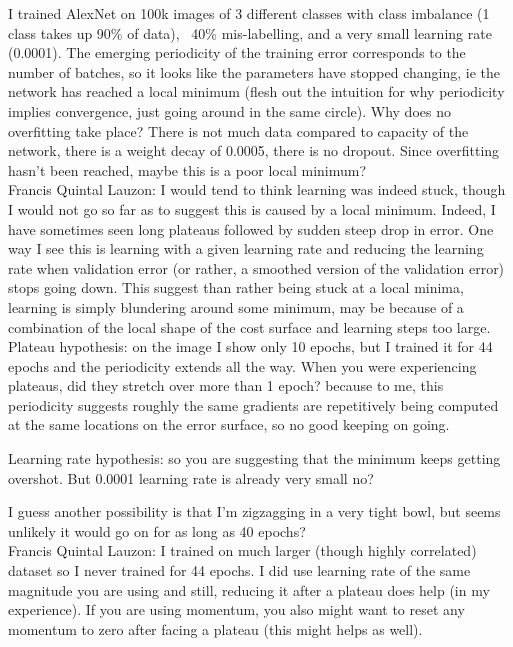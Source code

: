 \documentclass[a4paper,11pt]{article}
\begin{document}
I trained AlexNet on 100k images of 3 different classes with class imbalance (1 class takes up 90\% of data), ~40\% mis-labelling, and a very small learning rate (0.0001). The emerging periodicity of the training error corresponds to the number of batches, so it looks like the parameters have stopped changing, ie the network has reached a local minimum (flesh out the intuition for why periodicity implies convergence, just going around in the same circle). Why does no overfitting take place? There is not much data compared to capacity of the network, there is a weight decay of 0.0005,  there is no dropout. Since overfitting hasn't been reached, maybe this is a poor local minimum?﻿\\

Francis Quintal Lauzon: I would tend to think learning was indeed stuck, though I would not go so far as to suggest this is caused by a local minimum.
Indeed, I have sometimes seen long plateaus followed by sudden steep drop in error.  One way I see this is learning with a given learning rate and reducing the learning rate when validation error (or rather, a smoothed version of the validation error) stops going down.  This suggest than rather being stuck at a local minima, learning is simply blundering around some minimum, may be because of a combination of the local shape of the cost surface and learning steps too large. \\

Plateau hypothesis: on the image I show only 10 epochs, but I trained it for 44 epochs and the periodicity extends all the way. When you were experiencing plateaus, did they stretch over more than 1 epoch? because to me, this periodicity suggests roughly the same gradients are repetitively being computed at the same locations on the error surface, so no good keeping on going. 

Learning rate hypothesis: so you are suggesting that the minimum keeps getting overshot. But 0.0001 learning rate is already very small no?

I guess another possibility is that I'm zigzagging in a very tight bowl, but seems unlikely it would go on for as long as 40 epochs?﻿\\

Francis Quintal Lauzon: I trained on much larger (though highly correlated) dataset so I never trained for 44 epochs.  I did use learning rate of the same magnitude you are using and still, reducing it after a plateau does help (in my experience).  If you are using momentum, you also might want to reset any momentum to zero after facing a plateau (this might helps as well).﻿\\
\end{document}
